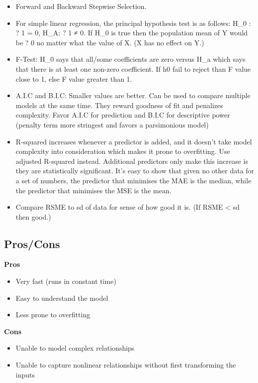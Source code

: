\documentclass[]{book}
\theoremstyle{definition}
\theoremstyle{definition}
\theoremstyle{definition}
\theoremstyle{remark}
\begin{document}
\begin{itemize}
\item
  Forward and Backward Stepwise Selection.
\item
  For simple linear regression, the principal hypothesis test is as
  follows: H\_0 : ? 1 = 0, H\_A: ? 1 ≠ 0. If H\_0 is true then the
  population mean of Y would be ? 0 no matter what the value of X. (X
  has no effect on Y.)
\item
  F-Test: H\_0 says that all/some coefficients are zero versus H\_a
  which says that there is at least one non-zero coefficient. If h0 fail
  to reject than F value close to 1, else F value greater than 1.
\item
  A.I.C and B.I.C: Smaller values are better. Can be used to compare
  multiple models at the same time. They reward goodness of fit and
  penalizes complexity. Favor A.I.C for prediction and B.I.C for
  descriptive power (penalty term more stringest and favors a
  parsimonious model)
\item
  R-squared increases whenever a predictor is added, and it doesn't take
  model complexity into consideration which makes it prone to
  overfitting. Use adjusted R-squared instead. Additional predictors
  only make this increase is they are statistically significant. It's
  easy to show that given no other data for a set of numbers, the
  predictor that minimises the MAE is the median, while the predictor
  that minimises the MSE is the mean.
\item
  Compare RSME to sd of data for sense of how good it is. (If RSME
  \textless{} sd then good.)
\end{itemize}

\subsection{Pros/Cons}\label{proscons}

\textbf{Pros}

\begin{itemize}
\item
  Very fast (runs in constant time)
\item
  Easy to understand the model
\item
  Less prone to overfitting
\end{itemize}

\textbf{Cons}

\begin{itemize}
\item
  Unable to model complex relationships
\item
  Unable to capture nonlinear relationships without first transforming
  the inputs
\end{itemize}
\end{document}
